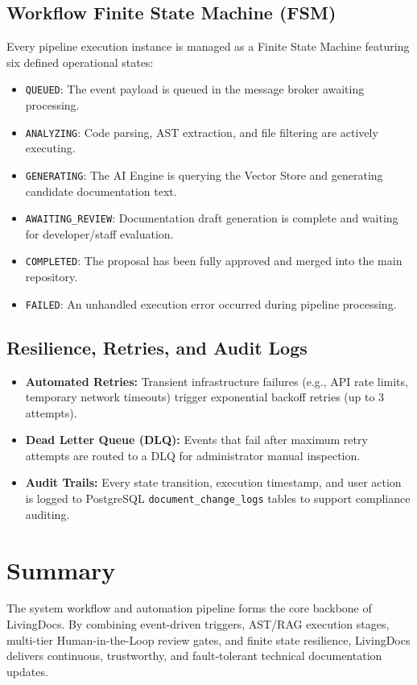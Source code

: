 \subsection{Workflow Finite State Machine (FSM)}
Every pipeline execution instance is managed as a Finite State Machine featuring six defined operational states:
\begin{itemize}
    \item \texttt{QUEUED}: The event payload is queued in the message broker awaiting processing.
    \item \texttt{ANALYZING}: Code parsing, AST extraction, and file filtering are actively executing.
    \item \texttt{GENERATING}: The AI Engine is querying the Vector Store and generating candidate documentation text.
    \item \texttt{AWAITING\_REVIEW}: Documentation draft generation is complete and waiting for developer/staff evaluation.
    \item \texttt{COMPLETED}: The proposal has been fully approved and merged into the main repository.
    \item \texttt{FAILED}: An unhandled execution error occurred during pipeline processing.
\end{itemize}

\subsection{Resilience, Retries, and Audit Logs}
\begin{itemize}
    \item \textbf{Automated Retries:} Transient infrastructure failures (e.g., API rate limits, temporary network timeouts) trigger exponential backoff retries (up to 3 attempts).
    \item \textbf{Dead Letter Queue (DLQ):} Events that fail after maximum retry attempts are routed to a DLQ for administrator manual inspection.
    \item \textbf{Audit Trails:} Every state transition, execution timestamp, and user action is logged to PostgreSQL \texttt{document\_change\_logs} tables to support compliance auditing.
\end{itemize}

\section{Summary}
The system workflow and automation pipeline forms the core backbone of LivingDocs. By combining event-driven triggers, AST/RAG execution stages, multi-tier Human-in-the-Loop review gates, and finite state resilience, LivingDocs delivers continuous, trustworthy, and fault-tolerant technical documentation updates.